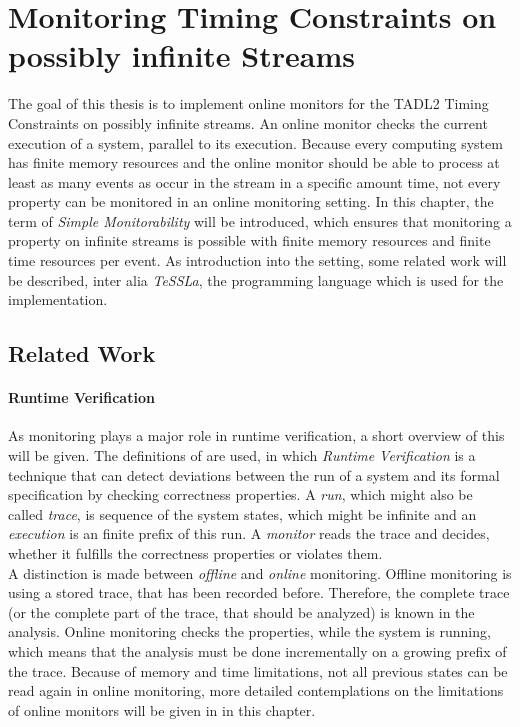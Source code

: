 
\chapter{Monitoring Timing Constraints on possibly infinite Streams}
\label{chapter-monitorability}
	The goal of this thesis is to implement online monitors for the TADL2 Timing Constraints on possibly infinite streams. An online monitor checks the current execution of a system, parallel to its execution. Because every computing system has finite memory resources and the online monitor should be able to process at least as many events as occur in the stream in a specific amount time, not every property can be monitored in an online monitoring setting. In this chapter, the term of \emph{Simple Monitorability} will be introduced, which ensures that monitoring a property on infinite streams is possible with finite memory resources and finite time resources per event. As introduction into the setting, some related work will be described, inter alia \emph{TeSSLa}, the programming language which is used for the implementation.

\section{Related Work}

	\subsubsection{Runtime Verification}
		As monitoring plays a major role in runtime verification, a short overview of this will be given. The definitions of \cite{RuntimeVerification} are used, in which \emph{Runtime Verification} is a technique that can detect deviations between the run of a system and its formal specification by checking correctness properties. A \emph{run}, which might also be called \emph{trace}, is sequence of the system states, which might be infinite and an \emph{execution} is an finite prefix of this run. A \emph{monitor} reads the trace and decides, whether it fulfills the correctness properties or violates them.\\
		A distinction is made between \emph{offline} and \emph{online} monitoring. Offline monitoring is using a stored trace, that has been recorded before. Therefore, the complete trace (or the complete part of the trace, that should be analyzed) is known in the analysis. Online monitoring checks the properties, while the system is running, which means that the analysis must be done incrementally on a growing prefix of the trace. Because of memory and time limitations, not all previous states can be read again in online monitoring, more detailed contemplations on the limitations of online monitors will be given in in this chapter.

